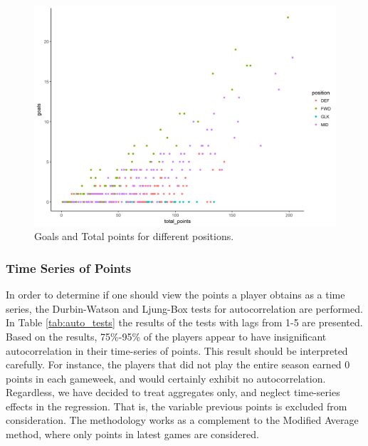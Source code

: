 \begin{figure}[H]
    \centering
    \includegraphics[scale=0.55]{fig/chapter_6/goals_tot_poins.png}
    \caption{Goals and Total points for different positions.}
\label{fig:goal_tot_p}    
\end{figure}

\subsubsection{Time Series of Points}

In order to determine if one should view the points a player obtains as a time series, the Durbin-Watson and Ljung-Box tests for autocorrelation are performed. In Table \ref{tab:auto_tests} the results of the tests with lags from 1-5 are presented. Based on the results, 75\%-95\% of the players appear to have insignificant autocorrelation in their time-series of points. This result should be interpreted carefully. For instance, the players that did not play the entire season earned 0 points in each gameweek, and would certainly exhibit no autocorrelation. Regardless, we have decided to treat aggregates only, and neglect time-series effects in the regression. That is, the variable previous points is excluded from consideration. The methodology works as a complement to the Modified Average method, where only points in latest games are considered.

